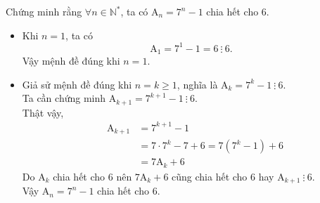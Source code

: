 \begin{bt}%
	Chứng minh rằng $\forall n \in \mathbb{N}^*$, ta có $\mathrm{A}_n=7^n-1$ chia hết cho $6$.
	\loigiai
	{
		\begin{itemize}
			\item Khi $n=1$, ta có \[\mathrm{A}_1=7^1-1=6~\vdots~6.\]
			Vậy mệnh đề đúng khi $n=1$.
			\item Giả sử mệnh đề đúng khi $n=k\ge1$, nghĩa là $\mathrm{A}_k=7^k-1~\vdots~6$.\\
			Ta cần chứng minh $\mathrm{A}_{k+1}=7^{k+1}-1~\vdots~6$.\\
			Thật vậy,
			\begin{eqnarray*}
				& \mathrm{A}_{k+1}&=7^{k+1}-1 \\
				&  &=7\cdot7^k-7+6=7(7^k-1)+6\\
				&  &=7\mathrm{A}_k+6
			\end{eqnarray*}
			Do $\mathrm{A}_k$ chia hết cho $6$ nên $7\mathrm{A}_k+6$ cũng chia hết cho $6$ hay $\mathrm{A}_{k+1}~\vdots~6$.\\
			Vậy $\mathrm{A}_n=7^n-1$ chia hết cho $6$.
		\end{itemize}
	}
\end{bt}

